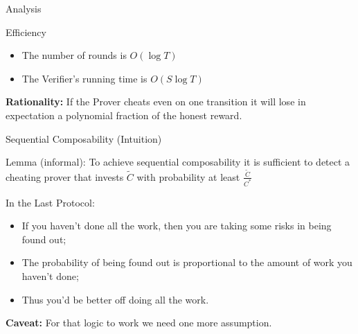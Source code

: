 \begin{frame}{Analysis}
	\begin{block}{Efficiency}
	\begin{itemize}[<+- | alert@+>]
		\item The number of rounds is $O(\log T)$
		\item The Verifier's running time is $O(S \log T)$
	\end{itemize}
	\end{block}
	\onslide<+->
	\textbf{Rationality:} If the Prover cheats even on one transition it will lose in expectation a polynomial fraction of the honest reward.
	\onslide<+->
%	
\end{frame}

\begin{frame}{Sequential Composability (Intuition)}
		\begin{block}{Lemma (informal):}
			To achieve sequential composability it is sufficient to detect a cheating prover that invests $\tilde{C}$ with probability at least $\frac{\tilde{C}}{C^*}$

		\end{block}
	
		\onslide<+->
		\begin{block}{In the Last Protocol:}
		\begin{itemize}[<+- | alert@+>]
			\item If you haven't done all the work, then you are taking some risks in being found out;
			\item The probability of being found out is proportional to the amount of work you haven't done;
			\item Thus you'd be better off doing all the work.
		\end{itemize}
		\end{block}
	\onslide<+->
	\textbf{Caveat:} For that logic to work we need one more assumption.
\end{frame}

